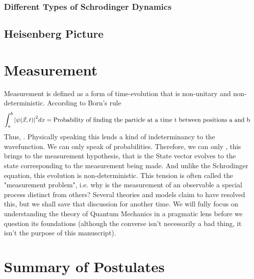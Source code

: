 \subsubsection{Different Types of Schrodinger Dynamics}

\subsection{Heisenberg Picture}
\section{Measurement}
Measurement is defined as a form of time-evolution that is non-unitary and non-deterministic. 
According to Born's rule
\begin{equation}
	\int_{a}^{b} \abs{\psi(\vec{x}, t)}^{2} dx = \text{Probability of finding the particle at a time t between positions a and b}
\end{equation}
Thus, . Physically speaking this lends a kind of indeterminancy to the wavefunction. We can only speak of probabilities. Therefore, we can only , this brings to the measurement hypothesis, that is the State vector evolves to the state corresponding to the measurement being made. And unlike the Schrodinger equation, this evolution is non-deterministic. This tension is often called the "measurement problem", i.e. why is the measurement of an observable a special process distinct from others? Several theories and models claim to have resolved this, but we shall save that discussion for another time. We will fully focus on understanding the theory of Quantum Mechanics in a pragmatic lens before we question its foundations (although the converse isn't necessarily a bad thing, it isn't the purpose of this manuscript).

\section{Summary of Postulates}

